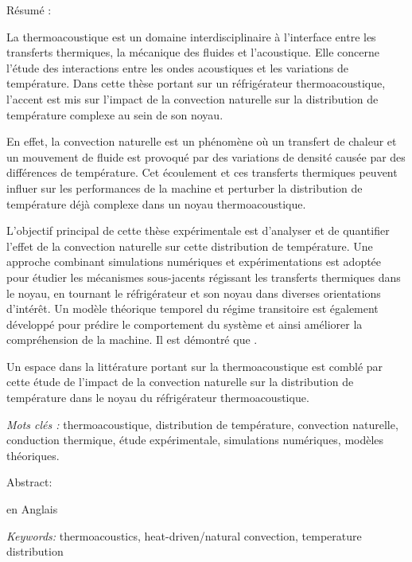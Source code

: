{

\vfill

{\Large Résumé :}\medskip

La thermoacoustique est un domaine interdisciplinaire à l'interface entre les transferts thermiques, la mécanique des fluides et l'acoustique. Elle concerne l'étude des interactions entre les ondes acoustiques et les variations de température. Dans cette thèse portant sur un réfrigérateur thermoacoustique, l'accent est mis sur l'impact de la convection naturelle sur la distribution de température complexe au sein de son noyau.

En effet, la convection naturelle est un phénomène où un transfert de chaleur et un mouvement de fluide est provoqué par des variations de densité causée par des différences de température. Cet écoulement et ces transferts thermiques peuvent influer sur les performances de la machine et  perturber la distribution de température déjà complexe dans un noyau thermoacoustique.

L'objectif principal de cette thèse expérimentale est d'analyser et de quantifier l'effet de la convection naturelle sur cette distribution de température. Une approche combinant simulations numériques et expérimentations est adoptée pour étudier les mécanismes sous-jacents régissant les transferts thermiques dans le noyau, en tournant le réfrigérateur et son noyau dans diverses orientations d'intérêt. Un modèle théorique temporel du régime transitoire est également développé pour prédire le comportement du système et ainsi améliorer la compréhension de la machine. Il est démontré que .

Un espace dans la littérature portant sur la thermoacoustique est comblé par cette étude de l'impact de la convection naturelle sur la distribution de température dans le noyau du réfrigérateur thermoacoustique.

\bigskip

{\large \textit{Mots clés :}} thermoacoustique,  distribution de température, convection naturelle, conduction thermique, étude expérimentale, simulations numériques, modèles théoriques.

\vfill

{\Large Abstract:}\medskip

en Anglais

\bigskip

{\large \textit{Keywords:}} thermoacoustics, heat-driven/natural convection, temperature distribution

\vfill
}